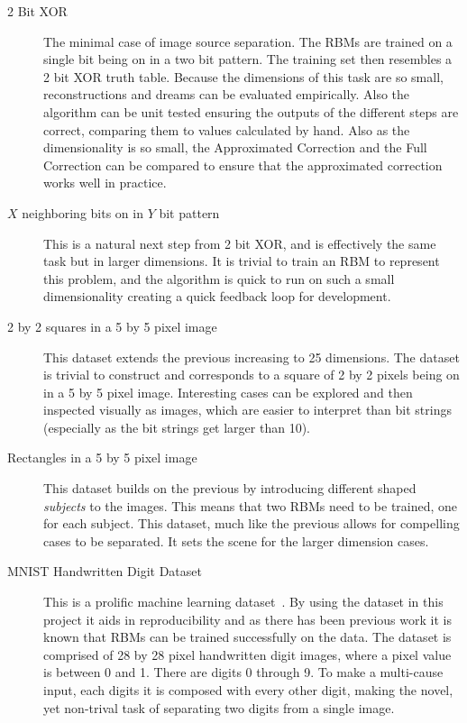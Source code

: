\begin{description}
  \item[2 Bit XOR] The minimal case of image source separation. The RBMs are trained on a single bit being on in a two bit pattern. The training set then resembles a 2 bit XOR truth table. Because the dimensions of this task are so small, reconstructions and dreams can be evaluated empirically. Also the algorithm can be unit tested ensuring the outputs of the different steps are correct, comparing them to values calculated by hand. Also as the dimensionality is so small, the Approximated Correction and the Full Correction can be compared to ensure that the approximated correction works well in practice.
  \item[$X$ neighboring bits on in $Y$ bit pattern] This is a natural next step from 2 bit XOR, and is effectively the same task but in larger dimensions. It is trivial to train an RBM to represent this problem, and the algorithm is quick to run on such a small dimensionality creating a quick feedback loop for development.
  \item[2 by 2 squares in a 5 by 5 pixel image] This dataset extends the previous increasing to 25 dimensions. The dataset is trivial to construct and corresponds to a square of 2 by 2 pixels being on in a 5 by 5 pixel image. Interesting cases can be explored and then inspected visually as images, which are easier to interpret than bit strings (especially as the bit strings get larger than 10).
  \item[Rectangles in a 5 by 5 pixel image] This dataset builds on the previous by introducing different shaped \emph{subjects} to the images. This means that two RBMs need to be trained, one for each subject. This dataset, much like the previous allows for compelling cases to be separated. It sets the scene for the larger dimension cases.
  \item[MNIST Handwritten Digit Dataset] This is a prolific machine learning dataset~\cite{mnistlecun}. By using the dataset in this project it aids in reproducibility and as there has been previous work it is known that RBMs can be trained successfully on the data. The dataset is comprised of 28 by 28 pixel handwritten digit images, where a pixel value is between 0 and 1. There are digits 0 through 9. To make a multi-cause input, each digits it is composed with every other digit, making the novel, yet non-trival task of separating two digits from a single image.
\end{description}
